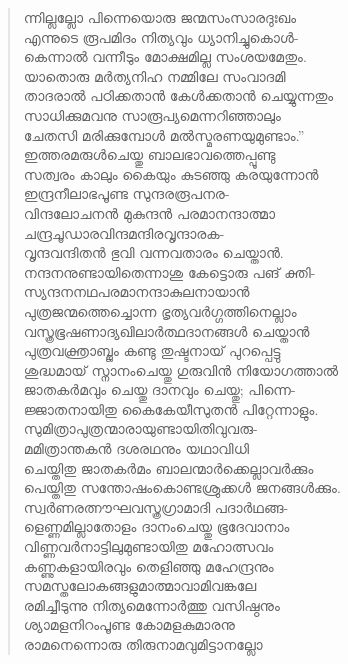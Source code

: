 \begin{verse}
ന്നില്ലല്ലോ പിന്നെയൊരു ജന്മസംസാരദുഃഖം\\
എന്നുടെ രൂപമിദം നിത്യവും ധ്യാനിച്ചുകൊള്‍-\\
കെന്നാല്‍ വന്നീടും മോക്ഷമില്ല സംശയമേതും.\\
യാതൊരു മര്‍ത്യനിഹ നമ്മിലേ സംവാദമി\\
താദരാല്‍ പഠിക്കതാന്‍ കേള്‍ക്കതാന്‍ ചെയ്യുന്നതും\\
സാധിക്കുമവനു സാരൂപ്യമെന്നറിഞ്ഞാലും\\
ചേതസി മരിക്കുമ്പോള്‍ മല്‍സ്മരണയുമുണ്ടാം.”\\
ഇത്തരമരുള്‍ചെയ്തു ബാലഭാവത്തെപ്പൂണ്ടു\\
സത്വരം കാലും കൈയും കുടഞ്ഞു കരയുന്നോന്‍\\
ഇന്ദ്രനീലാഭപൂണ്ട സുന്ദരരൂപനര-\\
വിന്ദലോചനന്‍ മുകുന്ദന്‍ പരമാനന്ദാത്മാ\\
ചന്ദ്രചൂഡാരവിന്ദമന്ദിരവൃന്ദാരക-\\
വൃന്ദവന്ദിതന്‍ ഭുവി വന്നവതാരം ചെയ്താന്‍.\\
നന്ദനനുണ്ടായിതെന്നാശു കേട്ടൊരു പങ് ക്തി-\\
സ്യന്ദനനഥപരമാനന്ദാകുലനായാന്‍\\
പുത്രജന്മത്തെച്ചൊന്ന ഭൃത്യവര്‍ഗ്ഗത്തിനെല്ലാം\\
വസ്ത്രഭൂഷണാദ്യഖിലാര്‍ത്ഥദാനങ്ങള്‍ ചെയ്താന്‍\\
പുത്രവക്ത്രാബ്ജം കണ്ടു തുഷ്ടനായ് പുറപ്പെട്ടു\\
ശുദ്ധമായ് സ്നാനംചെയ്തു ഗുരുവിന്‍ നിയോഗത്താല്‍\\
ജാതകര്‍മവും ചെയ്തു ദാനവും ചെയ്തു; പിന്നെ-\\
ജ്ജാതനായിതു കൈകേയീസുതന്‍ പിറ്റേന്നാളും.\\
സുമിത്രാപുത്രന്മാരായുണ്ടായിതിവുവരു-\\
മമിത്രാന്തകന്‍ ദശരഥനും യഥാവിധി\\
ചെയ്തിതു ജാതകര്‍മം ബാലന്മാര്‍ക്കെല്ലാവര്‍ക്കും\\
പെയ്തിതു സന്തോഷംകൊണ്ടശ്രുക്കള്‍ ജനങ്ങള്‍ക്കും.\\
സ്വര്‍ണരത്നൗഘവസ്ത്രഗ്രാമാദി പദാര്‍ഥങ്ങ-\\
ളെണ്ണമില്ലാതോളം ദാനംചെയ്തു ഭൂദേവാനാം\\
വിണ്ണവര്‍നാട്ടിലുമുണ്ടായിതു മഹോത്സവം\\
കണ്ണുകളായിരവും തെളിഞ്ഞു മഹേന്ദ്രനും\\
സമസ്തലോകങ്ങളുമാത്മാവാമിവങ്കലേ\\
രമിച്ചീടുന്നു നിത്യമെന്നോര്‍ത്തു വസിഷ്ഠനും\\
ശ്യാമളനിറംപൂണ്ട കോമളകുമാരനു\\
രാമനെന്നൊരു തിരുനാമവുമിട്ടാനല്ലോ\\

\end{verse}
